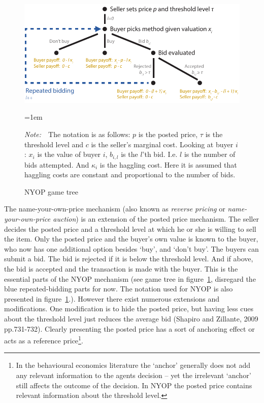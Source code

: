 \documentclass[a4paper,12pt]{article}
\newcommand{\Figtext}[1]{%
	\begin{tablenotes}[para,flushleft]
		\hangindent=1em
		\footnotesize
		\raggedright
		#1
	\end{tablenotes}
}
\newcommand{\Fignote}[1]{\Figtext{\emph{Note:~}~#1}}
\begin{document}
	\begin{figure}
	        \centering
	        \caption{NYOP game tree}
	        \includegraphics[width=\textwidth]{Figures/NYOP_GameTree}
			\label{fig:game_tree}
			\Fignote{The notation is as follows: $p$ is the posted price, $\tau$ is the threshold level and $c$ is the seller's marginal cost. Looking at buyer $i$: $x_i$ is the value of buyer $i$, $b_{i,l}$ is the $l$'th bid. I.e. $l$ is the number of bids attempted. And $\kappa_i$ is the haggling cost. Here it is assumed that haggling costs are constant and proportional to the number of bids.}
	\end{figure}

	The name-your-own-price mechanism (also known as {\it reverse pricing} or {\it name-your-own-price auction}) is an extension of the posted price mechanism. The seller decides the posted price and a threshold level at which he or she is willing to sell the item. Only the posted price and the buyer's own value is known to the buyer, who now has one additional option besides `buy', and `don't buy'. The buyers can submit a bid. The bid is rejected if it is below the threshold level. And if above, the bid is accepted and the transaction is made with the buyer. This is the essential parts of the NYOP mechanism (see game tree in figure~\ref{fig:game_tree}, disregard the blue repeated-bidding parts for now. The notation used for NYOP is also presented in figure~\ref{fig:game_tree}.). However there exist numerous extensions and modifications. One modification is to hide the posted price, but having less cues about the threshold level just reduces the average bid (Shapiro and Zillante, 2009 pp.731-732). Clearly presenting the posted price has a sort of anchoring effect or acts as a reference price\footnote{In the behavioural economics literature the `anchor' generally does not add any relevant information to the agents decision -- yet the irrelevant `anchor' still affects the outcome of the decision. In NYOP the posted price contains relevant information about the threshold level.}.
	
\end{document}
